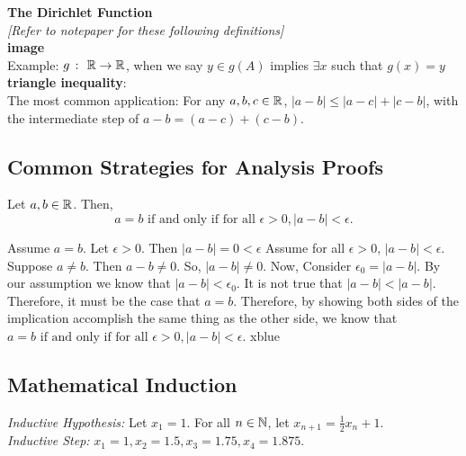 \textbf{\Gls{The Dirichlet Function}} \\

\textit{[Refer to notepaper for these following definitions]} \\

\textbf{\Gls{image}} \\

Example: \(g \ \colon \ \mathbb{R} \rightarrow \mathbb{R}\), when we say \(y \in g(A)\) implies \(\exists x\) such that \(g(x) = y\) \\

\hypertarget{Triangle Inequality}{}
\textbf{\Gls{triangle inequality}}: \\
The most common application: For any \(a,b,c \in \mathbb{R}\), \(|a - b| \leq |a-c| + |c-b|\), with the intermediate step of \(a - b = (a-c) + (c-b)\).

\subsection{Common Strategies for Analysis Proofs} \hfill

\setcounter{BoxCounter}{5}
\begin{theorem}
    Let \(a,b \in \mathbb{R}\). Then, \[a = b \text{ if and only if for all } \epsilon > 0, |a-b| < \epsilon.\]
\end{theorem}

\iffpf
    {Assume \(a = b\). Let \(\epsilon > 0\). Then \(|a-b| = 0 < \epsilon\)}
    {Assume for all \(\epsilon > 0\), \(|a-b| < \epsilon\). Suppose \(a \ne b\). Then \(a - b \ne 0\). So, \(|a-b| \ne 0\). Now, Consider \(\epsilon_0 = |a-b|\). By our assumption we know that \(|a-b| < \epsilon_0\). It is not true that \(|a-b| < |a - b|\). Therefore, it must be the case that \(a = b\).}
    {Therefore, by showing both sides of the implication accomplish the same thing as the other side, we know that \(a = b \text{ if and only if for all } \epsilon > 0, |a-b| < \epsilon.\)}
    {xblue}

\subsection{Mathematical Induction} \hfill

\textit{Inductive Hypothesis:} Let \(x_1 = 1\). For all \(n \in \mathbb{N}\), let \(x_{n+1} = \frac{1}{2}x_n + 1\). \\

\textit{Inductive Step:} \(x_1 = 1, x_2 = 1.5, x_3 = 1.75, x_4 = 1.875\). \\

